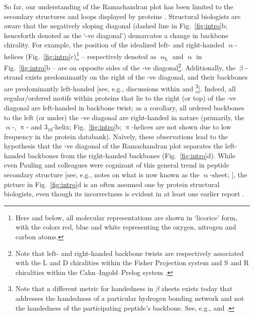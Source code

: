 \documentclass[fleqn,10pt]{wlpeerj} %
\newcommand{\Fig}[1]{Fig.~\ref{#1}}
\begin{document}
So far, our understanding of the Ramachandran plot has been limited to the secondary structures and loops displayed by proteins \citep{Berman2000,Alberts2002}. Structural biologists are aware that the negatively sloping diagonal (dashed line in \Fig{fig:intro}b; henceforth denoted as the `-ve diagonal') demarcates a change in backbone chirality. For example, the position of the idealized left- and right-handed $\upalpha$-helices (\Fig{fig:intro}c)\footnote{Here and below, all molecular representations are shown in `licorice' form, with the colors red, blue and white representing the oxygen, nitrogen and carbon atoms.} -- respectively denoted as $\upalpha_\textrm{L}$ and $\upalpha$ in \Fig{fig:intro}b -- are on opposite sides of the -ve diagonal\footnote{Note that left- and right-handed backbone twists are respectively associated with the L and D chiralities within the Fisher Projection system and S and R chiralities within the Cahn--Ingold--Prelog system \citep{Cross2013}.}. Additionally, the $\upbeta$-strand exists predominantly on the right of the -ve diagonal, and their backbones are predominantly left-handed [see, e.g., discussions within \cite{Quiocho1977} and \cite{Shaw1977}\footnote{Note that a different metric for handedness in $\beta$ sheets exists today that addresses the handedness of a particular hydrogen bonding network and not the handedness of the participating peptide's backbone. See, e.g., \cite{Schulz1974} and \cite{Chothia1977}.}]. Indeed, all regular/ordered motifs within proteins that lie to the right (or top) of the -ve diagonal are left-handed in backbone twist; as a corollary, all ordered backbones to the left (or under) the -ve diagonal are right-handed in nature (primarily, the $\upalpha$-, $\uppi$- and $3_{10}$-helix; \Fig{fig:intro}b; $\uppi$-helices are not shown due to low frequency in the protein databank). Na{\"i}vely, these observations lead to the hypothesis that the -ve diagonal of the Ramachandran plot separates the left-handed backbones from the right-handed backbones (\Fig{fig:intro}d). While even Pauling and colleagues were cognizant of this general trend in peptide secondary structure [see, e.g., notes on what is now known as the $\upalpha$-sheet; \cite{Pauling1951,Pauling1951a,Pauling1951b}], the picture in \Fig{fig:intro}d is an often assumed one by protein structural biologists, even though its incorrectness is evident in at least one earlier report \citep{Zacharias2013}.
\end{document}
